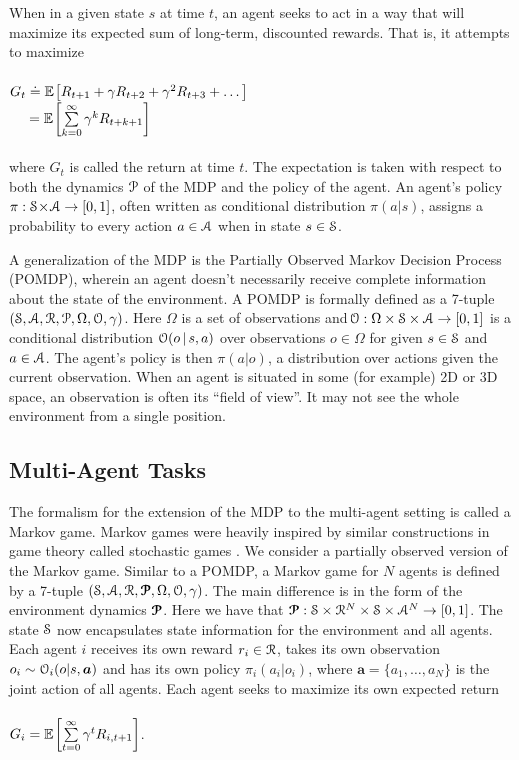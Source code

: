 \documentclass[11pt,journal,compsoc]{IEEEtran}
\begin{document}
	When in a given state $s$ at time $t$, an agent seeks to act in a way that will maximize its expected sum of long-term, discounted rewards. That is, it attempts to maximize\\
	\hfill\\ 
	$G_t \doteq \mathbb{E}_{\,\!\!}\left[R_{t+1}+\gamma R_{t+2}+\gamma^2 R_{t+3} +\dots\right]$\\
	$\hphantom{G_t} = \mathbb{E}_{\,\!\!}\left[\sum\limits_{k=0}^{\infty} \gamma^k R_{t+k+1}\right]$\\
	\hfill\\
	where $G_t$ is called the return at time $t$. The expectation is taken with respect to both the dynamics $\P$ of the MDP and the policy of the agent. An agent's policy $\pi:\S \!\cross\! \A \to [0,1]$, often written as conditional distribution $\pi(a|s)$, assigns a probability to every action $a \in \A$ when in state $s \in \S$.
	
	A generalization of the MDP is the Partially Observed Markov Decision Process (POMDP), wherein an agent doesn't necessarily receive complete information about the state of the environment. A POMDP is formally defined as a 7-tuple $(\S, \A, \R, \P, \Omega, \O, \gamma)$. Here $\Omega$ is a set of observations and $\!\O:\Omega \cross \S \cross \A \to [0,1]$ is a conditional distribution $\O(o\,|\,s,a)$ over observations $o\in \Omega$ for given $s\in\S$ and $a\in\A$. The agent's policy is then $\pi(a|o)$, a distribution over actions given the current observation. When an agent is situated in some (for example) 2D or 3D space, an observation is often its ``field of view''. It may not see the whole environment from a single position.
	
	\subsection{Multi-Agent Tasks}
	The formalism for the extension of the MDP to the multi-agent setting is called a Markov game. Markov games were heavily inspired by similar constructions in game theory called stochastic games \cite{stochastic_games}. We consider a partially observed version of the Markov game. Similar to a POMDP, a Markov game for $N$ agents is defined by a 7-tuple $(\S, \A, \R, \bm{\P}, \Omega, \O, \gamma)$. The main difference is in the form of the environment dynamics $\bm{\P}$. Here we have that $\bm{\P}:\S \cross \R^N \cross \S \cross \A^N \to [0,1]$. The state $\S$ now encapsulates state information for the environment and all agents. Each agent $i$ receives its own reward $r_i \in \R$, takes its own observation $o_i \sim \O_i(o|s,\bm{a})$ and has its own policy $\pi_i(a_i|o_i)$, where $\bm{a}=\{a_1, \dots, a_N\}$ is the joint action of all agents. Each agent seeks to maximize its own expected return \\
	\hfill\\
	$G_{i} = \mathbb{E}_{\,\!\!}\left[\sum\limits_{t=0}^{\infty} \gamma^t R_{i,t+1}\right]$. \\
	
\end{document}
